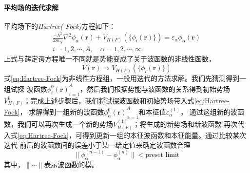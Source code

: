 \paragraph*{平均场的迭代求解}
平均场下的\textsl{Hartree(-Fock)}方程如下：
\begin{equation}
    \begin{aligned}
        \frac{-\hbar^{2}}{2m_N} \nabla^{2} \phi_{\alpha}(\bm{r}) + V_{H(F)}\left(
        \{\phi_{i}(\bm{r})\}\right) = \varepsilon_{\alpha}\phi_{\alpha}(\bm{r}) \\ 
        i = 1, 2, \cdots, A, \quad \alpha = 1, 2, \cdots, \infty
    \end{aligned}
    \label{eq:Hartree-Fock}
\end{equation}
上式与薛定谔方程唯一不同就是势能变成了关于波函数的非线性函数，
\begin{equation*} V(\bm{r}) \Longrightarrow V_{H(F)}(\{\phi_{i}(\bm{r})\})
\end{equation*}
式\eqref{eq:Hartree-Fock}为非线性方程组，一般用迭代的方法求解。我们先猜测得到一组试探
波函数${\phi_i^0(\bm{r})}_{i=1}^{A}$，然后我们根据势能与波函数的关系得到初始势场
$V_{H(F)}^{0}$；完成上述步骤后，我们将试探波函数和初始势场带入式\eqref{eq:Hartree-Fock}，
求解得到一组新的波函数${\phi_{\alpha}^0(\bm{r})}_{\alpha=1}^{A}$和本征值$\varepsilon_{\alpha}^{(1)}$，
通过这组新的波函数，我们可以再次生成一个新的势场$V_{H(F)}^{(1)}$；将生成的新势场和新波函数
再次代入式\eqref{eq:Hartree-Fock}，可得到更新一组的本征波函数和本征能量。通过比较某次迭代
前后的波函数间的误差小于某一给定值来确定波函数合理
\begin{equation}
    \parallel \phi_{\alpha}^{(n-1)} - \phi_{\alpha}^{(n)} \parallel < \text{preset limit}
    \label{eq:iter-error}
\end{equation}
其中，$\parallel \cdots \parallel$表示波函数的模。

